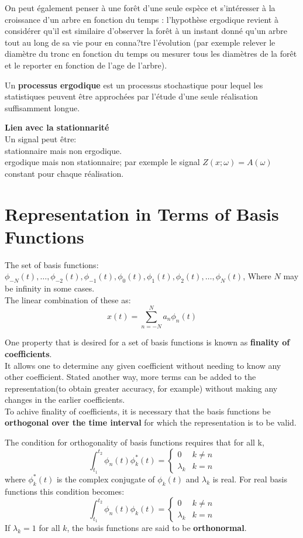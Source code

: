 \documentclass{article}
\begin{document}
On peut également penser à une forêt d'une seule espèce et s'intéresser à la croissance d'un arbre en fonction du temps : l'hypothèse ergodique revient à considérer qu'il est similaire d'observer la forêt à un instant donné qu'un arbre tout au long de sa vie pour en conna?tre l'évolution (par exemple relever le diamètre du tronc en fonction du temps ou mesurer tous les diamètres de la forêt et le reporter en fonction de l'age de l'arbre).

\bigskip
Un \textbf{processus ergodique} est un processus stochastique pour lequel les statistiques peuvent être approchées par l'étude d'une seule réalisation suffisamment longue.

\bigskip
\textbf{Lien avec la stationnarité}\\
Un signal peut être:\\
stationnaire mais non ergodique.\\
ergodique mais non stationnaire; par exemple le signal $Z(x; \omega)=A(\omega)$ constant pour chaque réalisation.

\section{Representation in Terms of Basis Functions}
The set of basis functions: $ \phi_{-N}(t), \ldots, \phi_{-2}(t), \phi_{-1}(t), \phi_0(t), \phi_1(t), \phi_2(t), \ldots, \phi_N(t)$, Where $N$ may be infinity in some cases.\\
The linear combination of these as:
\begin{equation}
x(t) = \sum_{n = -N}^N a_n \phi_n(t)
\label{eq.base.combination}
\end{equation}

One property that is desired for a set of basis functions is known as \textbf{finality of coefficients}.\\
It allows one to determine any given coefficient without needing to know any other coefficient. 
Stated another way, more terms can be added to the representation(to obtain greater accuracy, for example) without making any changes in the earlier coefficients.\\
To achive finality of coefficients, it is necessary that the basis functions be \textbf{orthogonal over the time interval} 
for which the representation is to be valid.

The condition for orthogonality of basis functions requires that for all k,
$$
\int_{t_1}^{t_2} \phi_n(t) \phi_k^{*}(t)
=
\begin{cases}
	0 & k \neq n\\
	\lambda_k & k = n
\end{cases}
$$
where $\phi_k^{*}(t)$ is the complex conjugate of $\phi_k(t)$ and $\lambda_k$ is real. For real basis functions this condition becomes:
$$
\int_{t_1}^{t_2} \phi_n(t) \phi_k(t)
=
\begin{cases}
	0 & k \neq n\\
	\lambda_k & k = n
\end{cases}
$$
If $\lambda_k = 1$ for all $k$, the basis functions are said to be \textbf{orthonormal}.
\end{document}
